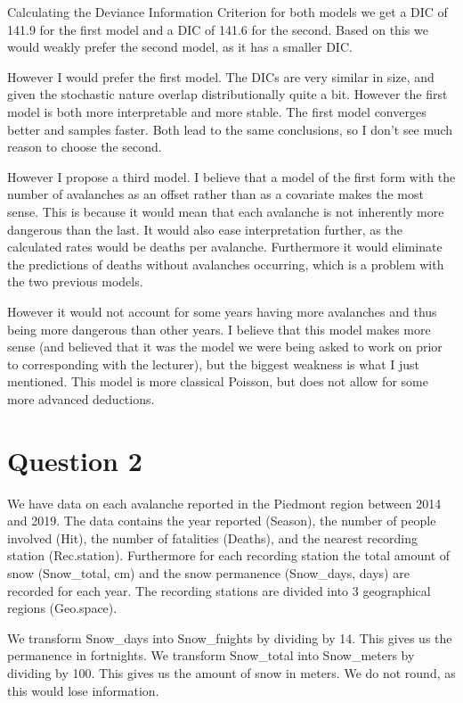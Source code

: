 \documentclass[12pt]{extarticle}
\begin{document}
Calculating the Deviance Information Criterion for both models we get a DIC of 141.9 for the first model and a DIC of 141.6 for the second. Based on this we would weakly prefer the second model, as it has a smaller DIC. 

However I would prefer the first model. The DICs are very similar in size, and given the stochastic nature overlap distributionally quite a bit. However the first model is both more interpretable and more stable. The first model converges better and samples faster. Both lead to the same conclusions, so I don't see much reason to choose the second. 

However I propose a third model. I believe that a model of the first form with the number of avalanches as an offset rather than as a covariate makes the most sense. This is because it would mean that each avalanche is not inherently more dangerous than the last. It would also ease interpretation further, as the calculated rates would be deaths per avalanche. Furthermore it would eliminate the predictions of deaths without avalanches occurring, which is a problem with the two previous models. 

However it would not account for some years having more avalanches and thus being more dangerous than other years. I believe that this model makes more sense (and believed that it was the model we were being asked to work on prior to corresponding with the lecturer), but the biggest weakness is what I just mentioned. This model is more classical Poisson, but does not allow for some more advanced deductions. 

\section*{Question 2}

We have data on each avalanche reported in the Piedmont region between 2014 and 2019. The data contains the year reported (Season), the number of people involved (Hit), the number of fatalities (Deaths), and the nearest recording station (Rec.station). Furthermore for each recording station the total amount of snow (Snow\_total, cm) and the snow permanence (Snow\_days, days) are recorded for each year. The recording stations are divided into 3 geographical regions (Geo.space). 

We transform Snow\_days into Snow\_fnights by dividing by 14. This gives us the permanence in fortnights. We transform Snow\_total into Snow\_meters by dividing by 100. This gives us the amount of snow in meters.  We do not round, as this would lose information. 
\end{document}

